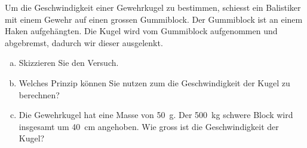 
\begin{aufgabe}
	Um die Geschwindigkeit einer Gewehrkugel zu bestimmen, schiesst ein Balistiker mit einem Gewehr auf einen grossen Gummiblock.
	Der Gummiblock ist an einem Haken aufgehängten.
	Die Kugel wird vom Gummiblock aufgenommen und abgebremst, dadurch wir dieser ausgelenkt.
	\begin{enumerate} [a)]
		\item Skizzieren Sie den Versuch.
		\item Welches Prinzip können Sie nutzen zum die Geschwindigkeit der Kugel zu berechnen?
		\item Die Gewehrkugel hat eine Masse von \SI{50}{g}. Der \SI{500}{kg} schwere Block wird insgesamt um \SI{40}{cm} angehoben.
			Wie gross ist die Geschwindigkeit der Kugel?
	\end{enumerate}
\end{aufgabe}


